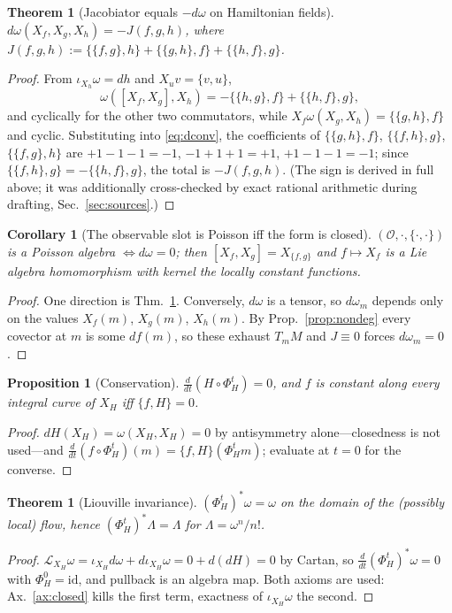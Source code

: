 \documentclass[12pt,a4paper]{article}
\theoremstyle{definition}
\theoremstyle{plain}
\newtheorem{proposition}[definition]{Proposition}
\newtheorem{theorem}[definition]{Theorem}
\newtheorem{corollary}[definition]{Corollary}
\theoremstyle{commentary}
\newcommand{\Oc}{\mathcal{O}}
\newcommand{\pb}[2]{\{#1,#2\}}
\begin{document}
\begin{theorem}[Jacobiator equals $-d\omega$ on Hamiltonian fields]\label{thm:jacobi}
$d\omega(X_f,X_g,X_h)=-J(f,g,h)$, where
$J(f,g,h):=\pb{\pb{f}{g}}{h}+\pb{\pb{g}{h}}{f}+\pb{\pb{h}{f}}{g}$.
\end{theorem}
\begin{proof}
From $\iota_{X_h}\omega=dh$ and $X_uv=\pb{v}{u}$,
\[\omega([X_f,X_g],X_h)=-\pb{\pb{h}{g}}{f}+\pb{\pb{h}{f}}{g},\]
and cyclically for the other two commutators, while
$X_f\omega(X_g,X_h)=\pb{\pb{g}{h}}{f}$ and cyclic. Substituting into \eqref{eq:dconv}, the
coefficients of $\pb{\pb{g}{h}}{f}$, $\pb{\pb{f}{h}}{g}$, $\pb{\pb{f}{g}}{h}$ are $+1-1-1=-1$,
$-1+1+1=+1$, $+1-1-1=-1$; since $\pb{\pb{f}{h}}{g}=-\pb{\pb{h}{f}}{g}$, the total is $-J(f,g,h)$.
(The sign is derived in full above; it was additionally cross-checked by exact rational
arithmetic during drafting, Sec.~\ref{sec:sources}.)
\end{proof}

\begin{corollary}[The observable slot is Poisson iff the form is closed]\label{cor:poisson}
$(\Oc,\cdot,\pb{\cdot}{\cdot})$ is a Poisson algebra $\iff d\omega=0$; then $[X_f,X_g]=X_{\pb{f}{g}}$
and $f\mapsto X_f$ is a Lie algebra homomorphism with kernel the locally constant functions.
\end{corollary}
\begin{proof}
One direction is Thm.~\ref{thm:jacobi}. Conversely, $d\omega$ is a tensor, so $d\omega_m$ depends
only on the values $X_f(m)$, $X_g(m)$, $X_h(m)$. By Prop.~\ref{prop:nondeg} every covector at $m$ is
some $df(m)$, so these exhaust $T_mM$ and $J\equiv0$ forces $d\omega_m=0$.
\end{proof}

\begin{proposition}[Conservation]\label{prop:conserve}
$\tfrac{d}{dt}(H\circ\Phi^t_H)=0$, and $f$ is constant along every integral curve of $X_H$ iff
$\pb{f}{H}=0$.
\end{proposition}
\begin{proof}
$dH(X_H)=\omega(X_H,X_H)=0$ by antisymmetry alone---closedness is not used---and
$\tfrac{d}{dt}(f\circ\Phi^t_H)(m)=\pb{f}{H}(\Phi^t_Hm)$; evaluate at $t=0$ for the converse.
\end{proof}

\begin{theorem}[Liouville invariance]\label{thm:liouville}
$(\Phi^t_H)^*\omega=\omega$ on the domain of the (possibly local) flow, hence
$(\Phi^t_H)^*\Lambda=\Lambda$ for $\Lambda=\omega^n/n!$.
\end{theorem}
\begin{proof}
$\mathcal{L}_{X_H}\omega=\iota_{X_H}d\omega+d\iota_{X_H}\omega=0+d(dH)=0$ by Cartan, so
$\tfrac{d}{dt}(\Phi^t_H)^*\omega=0$ with $\Phi^0_H=\mathrm{id}$, and pullback is an algebra map. Both
axioms are used: Ax.~\ref{ax:closed} kills the first term, exactness of $\iota_{X_H}\omega$ the
second.
\end{proof}
\end{document}
